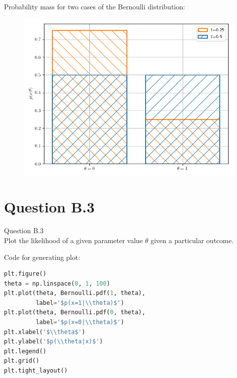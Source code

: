 \documentclass[usenames,dvipsnames,table]{beamer}
\begin{document}
\begin{frame}
Probability mass for two cases of the Bernoulli distribution:
\begin{figure}
\centering
\includegraphics[height=0.8\textheight]{img/ex3B2.png}
\end{figure}
\end{frame}










\section{Question B.3}
\begin{frame}
\begin{center}
{\huge{Question B.3}}
\\\vspace{2em}
Plot the likelihood of a given parameter value $\theta$ given a particular outcome.
\end{center}
\end{frame}

\begin{frame}[fragile]
Code for generating plot:
\begin{lstlisting}[language=Python]
plt.figure()
theta = np.linspace(0, 1, 100)
plt.plot(theta, Bernoulli.pdf(1, theta),
         label='$p(x=1|\\theta)$')
plt.plot(theta, Bernoulli.pdf(0, theta),
         label='$p(x=0|\\theta)$')
plt.xlabel('$\\theta$')
plt.ylabel('$p(\\theta|x)$')
plt.legend()
plt.grid()
plt.tight_layout()
\end{lstlisting}
\end{frame}
\end{document}
